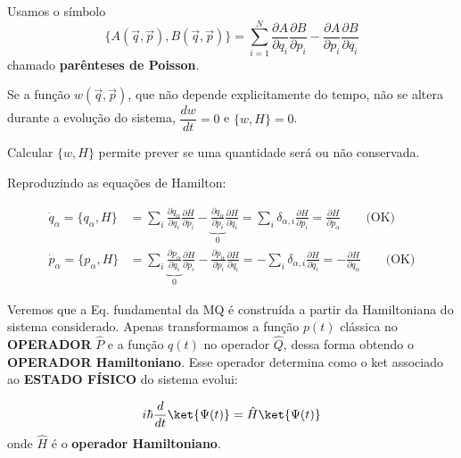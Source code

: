 Usamos o símbolo
\begin{equation}
    \{A(\vec{q}, \vec{p}), B(\vec{q}, \vec{p})\} = \sum_{i=1}^{N} \frac{\partial A}{\partial q_i}\frac{\partial B}{\partial p_i} - \frac{\partial A}{\partial p_i}\frac{\partial B}{\partial q_i}
\label{eq:aula9_poisson_def}
\end{equation}
chamado \textbf{parênteses de Poisson}.

Se a função $w(\vec{q}, \vec{p})$, que não depende explicitamente do tempo, não se altera durante a evolução do sistema, $\dfrac{dw}{dt} = 0$ e $\{w, H\} = 0$.

Calcular $\{w, H\}$ permite prever se uma quantidade será ou não conservada.


Reproduzindo as equações de Hamilton:

\begin{align}
    \dot{q}_\alpha = \{q_\alpha, H\} &= \sum_i \frac{\partial q_\alpha}{\partial q_i}\frac{\partial H}{\partial p_i} - \underbrace{\frac{\partial q_\alpha}{\partial p_i}}_{0}\frac{\partial H}{\partial q_i} = \sum_i \delta_{\alpha,i}\frac{\partial H}{\partial p_i} = \frac{\partial H}{\partial p_\alpha} \qquad \text{(OK)} \label{eq:aula9_qdot_poisson} \\
    \dot{p}_\alpha = \{p_\alpha, H\} &= \sum_i \underbrace{\frac{\partial p_\alpha}{\partial q_i}}_{0}\frac{\partial H}{\partial p_i} - \frac{\partial p_\alpha}{\partial p_i}\frac{\partial H}{\partial q_i} = -\sum_i \delta_{\alpha, i}\frac{\partial H}{\partial q_i} = -\frac{\partial H}{\partial q_\alpha} \qquad \text{(OK)} \label{eq:aula9_pdot_poisson}
\end{align}

Veremos que a Eq. fundamental da MQ é construída a partir da Hamiltoniana do sistema considerado. Apenas transformamos a função $p(t)$ clássica no \textbf{OPERADOR} $\hat{P}$ e a função $q(t)$ no operador $\hat{Q}$, dessa forma obtendo o \textbf{OPERADOR Hamiltoniano}. Esse operador determina como o ket associado ao \textbf{ESTADO FÍSICO} do sistema evolui:

\begin{equation}
    i\hbar \frac{d}{dt}\ket{\Psi(t)} = \hat{H}\ket{\Psi(t)}
\label{eq:aula9_eq_schrodinger}
\end{equation}
onde $\hat{H}$ é o \textbf{operador Hamiltoniano}.

